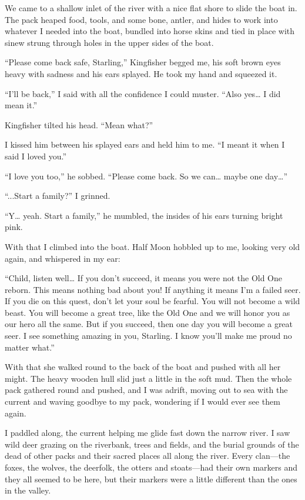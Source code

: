We came to a shallow inlet of the river with a nice flat shore to slide the boat in. The pack heaped food, tools, and some bone, antler, and hides to work into whatever I needed into the boat, bundled into horse skins and tied in place with sinew strung through holes in the upper sides of the boat.

``Please come back safe, Starling,'' Kingfisher begged me, his soft brown eyes heavy with sadness and his ears splayed. He took my hand and squeezed it.

``I'll be back,'' I said with all the confidence I could muster. ``Also yes\ldots{} I did mean it.''

Kingfisher tilted his head. ``Mean what?''

I kissed him between his splayed ears and held him to me. ``I meant it when I said I loved you.''

``I love you too,'' he sobbed. ``Please come back. So we can\ldots{} maybe one day\ldots''

``...Start a family?'' I grinned.

``Y\ldots{} yeah. Start a family,'' he mumbled, the insides of his ears turning bright pink.

With that I climbed into the boat. Half Moon hobbled up to me, looking very old again, and whispered in my ear:

``Child, listen well\ldots{} If you don't succeed, it means you were not the Old One reborn. This means nothing bad about you! If anything it means I'm a failed seer. If you die on this quest, don't let your soul be fearful. You will not become a wild beast. You will become a great tree, like the Old One and we will honor you as our hero all the same. But if you succeed, then one day you will become a great seer. I see something amazing in you, Starling. I know you'll make me proud no matter what.''

With that she walked round to the back of the boat and pushed with all her might. The heavy wooden hull slid just a little in the soft mud. Then the whole pack gathered round and pushed, and I was adrift, moving out to sea with the current and waving goodbye to my pack, wondering if I would ever see them again.

I paddled along, the current helping me glide fast down the narrow river. I saw wild deer grazing on the riverbank, trees and fields, and the burial grounds of the dead of other packs and their sacred places all along the river. Every clan---the foxes, the wolves, the deerfolk, the otters and stoats---had their own markers and they all seemed to be here, but their markers were a little different than the ones in the valley.

